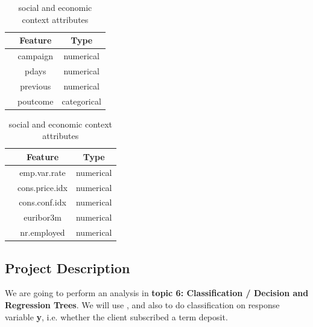 \documentclass[11pt,a4paper]{article}
\newcounter{magicrownumbers}
\newcommand\rownumber{\stepcounter{magicrownumbers}\arabic{magicrownumbers}}
\begin{document}
    \begin{table}[h]
        \begin{minipage}{.5\linewidth}
            \centering
            \begin{tabular}{r c c}
                 & Feature & Type \\
                \hline \hline
                \rownumber & campaign & numerical \\
                \rownumber & pdays & numerical \\
                \rownumber & previous & numerical \\
                \rownumber & poutcome & categorical \\
            \end{tabular}
            \caption{Other attributes}\label{tab:other}
        \end{minipage}%
        \begin{minipage}{.5\linewidth}
            \centering
            \begin{tabular}{r c c}
                 & Feature & Type \\
                \hline \hline
                \rownumber & emp.var.rate & numerical \\
                \rownumber & cons.price.idx & numerical \\
                \rownumber & cons.conf.idx & numerical \\
                \rownumber & euribor3m & numerical \\
                \rownumber & nr.employed & numerical \\
            \end{tabular}
            \caption{social and economic context attributes}\label{tab:soc.econ}
        \end{minipage}
    \end{table}
    
    \newpage
    \subsection{Project Description}
    We are going to perform an analysis in \textbf{topic 6: Classification / Decision and Regression Trees}. We will use ,  and also  to do classification on response variable \textbf{y}, i.e. whether the client subscribed a term deposit. \\
    
\end{document}
